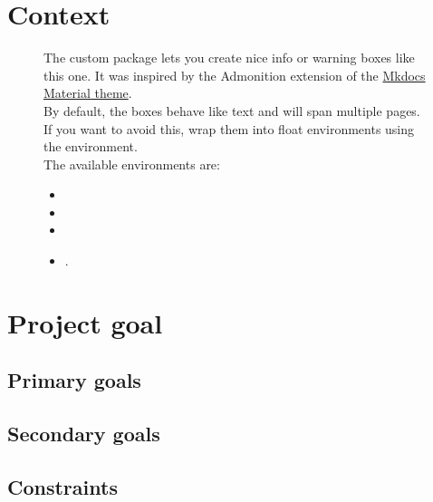 \chapter{Context}\label{chap:context}

\begin{figure}[ht!]
    \begin{infobox}
        The custom package  lets you create nice info or warning boxes like this one. It was inspired by the Admonition extension of the \href{https://squidfunk.github.io/mkdocs-material/extensions/admonition/}{Mkdocs Material theme}. \\
        By default, the boxes behave like text and will span multiple pages. If you want to avoid this, wrap them into float environments using the  environment. \\
    
        The available environments are:
        \begin{itemize}
            \item {}
            \item {}
            \item {}
            \item {}.
        \end{itemize}
    \end{infobox}
\end{figure}

\lipsum[1-20]

\chapter{Project goal}\label{chap:projectGoal}

\section{Primary goals}\label{chap:goalsPrimary}

\section{Secondary goals}\label{chap:goalsSecondary}

\section{Constraints}\label{chap:constraints}

